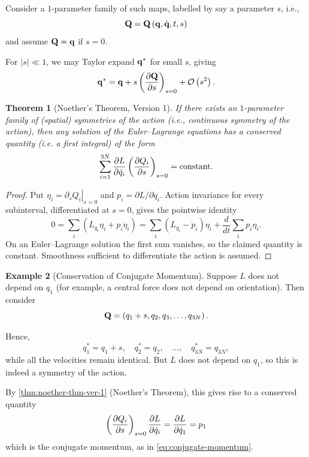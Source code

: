 \documentclass[11pt]{article}
\numberwithin{equation}{section}
\newtheorem{theorem}{Theorem}[section]
\theoremstyle{definition}
\newtheorem{example}[theorem]{Example}
\theoremstyle{remark}
\newcommand{\pqty}[1]{\left(#1\right)}
\newcommand{\abs}[1]{\left|#1\right|}
\newcommand{\bigO}{\mathcal{O}}
\begin{document}
Consider a \(1\)-parameter family of such maps, labelled by say a parameter \(s\), i.e.,
\[
    \vb{Q} = \vb{Q} \pqty{\vb{q}, \dot{\vb{q}}, t, s}
\]
and assume \(\vb{Q} = \vb{q}\) if \(s = 0\).

For \(\abs{s} \ll 1\), we may Taylor expand \(\vb{q}^{\ast}\) for small \(s\), giving
\begin{equation}
    \label{eq:image-curve-taylor}%
    \vb{q}^{\ast} = \vb{q} + s \pqty{\pdv{\vb{Q}}{s}}_{s = 0} + \bigO \pqty{s^2}.
\end{equation}

\begin{theorem}[Noether's Theorem, Version 1]\label{variation-unit-0075}
    \label{thm:noether-thm-ver-1}%
    If there exists an \(1\)-parameter family of (spatial) symmetries of the action (i.e., continuous symmetry of the action), then any solution of the Euler--Lagrange equations has a conserved quantity (i.e. a first integral) of the form
    \[
        \sum_{i = 1}^{3N} \pdv{L}{\dot{q}_i} \pqty{\pdv{Q_i}{s}}_{s = 0} = \text{constant}.
    \]
\end{theorem}

\begin{proof}
Put \(\eta_i=\left.\partial_sQ_i\right|_{s=0}\) and
\(p_i=\partial L/\partial\dot q_i\). Action invariance for every subinterval,
differentiated at \(s=0\), gives the pointwise identity
\[
0=\sum_i\left(L_{q_i}\eta_i+p_i\dot\eta_i\right)
 =\sum_i(L_{q_i}-\dot p_i)\eta_i+
 \frac{d}{dt}\sum_i p_i\eta_i.
\]
On an Euler--Lagrange solution the first sum vanishes, so the claimed quantity
is constant. Smoothness sufficient to differentiate the action is assumed.
\end{proof}

\begin{example}[Conservation of Conjugate Momentum]\label{variation-unit-0076}
    Suppose \(L\) does not depend on \(q_1\) (for example, a central force does not depend on orientation). Then consider
    \[
        \vb{Q} = \pqty{q_1 + s, q_2, q_3, \ldots, q_{3N}}.
    \]

    Hence,
    \[
        q^{\ast}_1 = q_1 + s, \quad q^{\ast}_2 = q_2, \quad \ldots, \quad q^{\ast}_{3N} = q_{3N},
    \]
    while all the velocities remain identical. But \(L\) does not depend on \(q_1\), so this is indeed a symmetry of the action.

    By \autoref{thm:noether-thm-ver-1} (Noether's Theorem), this gives rise to a conserved quantity
    \[
        \pqty{\pdv{Q_i}{s}}_{s = 0} \pdv{L}{\dot{q}_i} = \pdv{L}{\dot{q}_1} = p_1
    \]
    which is the conjugate momentum, as in \autoref{eq:conjugate-momentum}.
\end{example}
\end{document}
